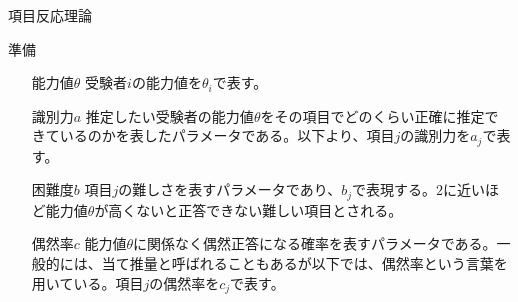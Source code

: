 \documentclass[dvipdfmx,fleqn]{beamer}
\begin{document}
\begin{frame}{項目反応理論}
	\begin{dblock}{準備}
    \begin{itemize}
      \item[能力値$\theta$]受験者$i$の能力値を$\theta_i$で表す。
      \item[識別力$a$]推定したい受験者の能力値$\theta$をその項目でどのくらい正確に推定できているのかを表したパラメータである。以下より、項目$j$の識別力を$a_j$で表す。
      \item[困難度$b$]項目$j$の難しさを表すパラメータであり、$b_j$で表現する。$2$に近いほど能力値$\theta$が高くないと正答できない難しい項目とされる。
      \item[偶然率$c$]能力値$\theta$に関係なく偶然正答になる確率を表すパラメータである。一般的には、当て推量と呼ばれることもあるが以下では、偶然率という言葉を用いている。項目$j$の偶然率を$c_j$で表す。
    \end{itemize}
	\end{dblock}
\end{frame}
\end{document}
